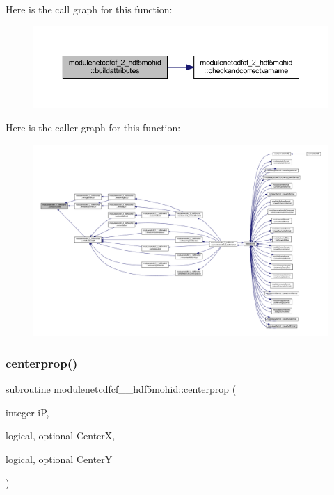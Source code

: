Here is the call graph for this function\+:\nopagebreak
\begin{figure}[H]
\begin{center}
\leavevmode
\includegraphics[width=350pt]{namespacemodulenetcdfcf__2__hdf5mohid_a9dbafb9898bd3f5184bc0e6cd96e5fbc_cgraph}
\end{center}
\end{figure}
Here is the caller graph for this function\+:\nopagebreak
\begin{figure}[H]
\begin{center}
\leavevmode
\includegraphics[width=350pt]{namespacemodulenetcdfcf__2__hdf5mohid_a9dbafb9898bd3f5184bc0e6cd96e5fbc_icgraph}
\end{center}
\end{figure}
\mbox{\label{namespacemodulenetcdfcf__2__hdf5mohid_a8712e5cb09686b66d3aa9f8e05e3bd82}} 
\subsubsection{\texorpdfstring{centerprop()}{centerprop()}}
{\footnotesize\ttfamily subroutine modulenetcdfcf\+\_\+\_\+hdf5mohid\+::centerprop (\begin{DoxyParamCaption}\item[{integer}]{iP,  }\item[{logical, optional}]{CenterX,  }\item[{logical, optional}]{CenterY }\end{DoxyParamCaption})\hspace{0.3cm}{\ttfamily [private]}}


